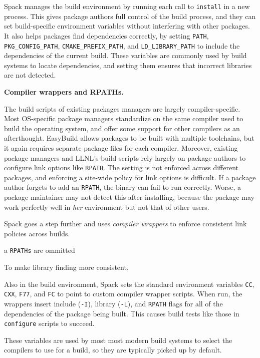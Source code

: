 Spack manages the build environment by running each call to {\tt install}
in a new process.  This gives package authors full control of the build
process, and they can set build-specific environment variables without 
interfering with other packages.  It also helps packages find dependencies 
correctly, by setting
{\tt PATH}, {\tt PKG\_CONFIG\_PATH}, {\tt CMAKE\_PREFIX\_PATH}, and
{\tt LD\_LIBRARY\_PATH} to include the dependencies of the current build.
These variables are commonly used by build systems to locate dependencies,
and setting them ensures that incorrect libraries are not detected.

{\bf Compiler wrappers and RPATHs.}


The build scripts of existing packages managers are largely compiler-specific.
Most OS-specific package managers standardize on the same compiler used to build
the operating system, and offer some support for other compilers as an afterthought.
EasyBuild allows packages to be built with multiple toolchains, but it again
requires separate package files for each compiler.  Moreover, existing
package managers and LLNL's build scripts rely largely on package authors
to configure link options like {\tt RPATH}.  The setting is not enforced across
different packages, and enforcing a site-wide policy for link options is 
difficult.  If a package author forgets to add an {\tt RPATH}, the binary
can fail to run correctly.  Worse, a package maintainer may not detect this
after installing, because the package may work perfectly well in {\it her} 
environment but not that of other users.

Spack goes a step further and uses {\it compiler wrappers} to enforce
consistent link policies across builds.  



 a {\tt RPATHs} are ommitted

To make library finding more consistent, 

Also in the build environment, Spack sets the standard environment variables
{\tt CC}, {\tt CXX}, {\tt F77}, and {\tt FC} to point to custom compiler
wrapper scripts.  When run, the wrappers insert include ({\tt -I}), 
library ({\tt -L}), and {\tt RPATH} flags for all of the dependencies of
the package being built. This causes build tests like those in {\tt configure}
scripts to succeed.


These variables are used by most most modern build systems
to select the compilers to use for a build, so they are typically picked up
by default.

